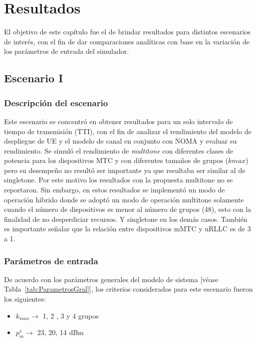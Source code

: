 
\chapter{Resultados} %

\label{Chapter7} %

El objetivo de este capítulo fue el de brindar resultados para distintos escenarios de interés, con el fin de dar comparaciones analíticas con base en la variación de los parámetros de entrada del simulador.


\section{Escenario I} %
\subsection{Descripción del escenario}
Este escenario se concentró en obtener resultados para un solo intervalo de tiempo de transmisión (TTI), con el fin de analizar el rendimiento del modelo de despliegue de UE y el modelo de canal en conjunto con NOMA y evaluar su rendimiento.
Se simuló el rendimiento de \textit{multitone} con diferentes clases de potencia para los dispositivos MTC y con diferentes tamaños de grupos ($kmax$) pero su desempeño no resultó ser importante ya que resultaba ser similar al de singletone. Por este motivo los resultados con la propuesta multitone no se reportaron. Sin embargo, en estos resultados se implementó un modo de operación hibrido donde se adoptó un modo de operación multitone solamente cuando el número de dispositivos es menor al número de grupos (48), esto con la finalidad de no desperdiciar recursos. Y singletone en los demás casos.
También es importante señalar que la relación entre dispositivos mMTC y uRLLC es de 3 a 1.
\subsection{Parámetros de entrada}
De acuerdo con los parámetros generales del modelo de sistema [véase Tabla~\ref{tab:ParametrosGral}], los criterios considerados para este escenario fueron los siguientes:
\begin{itemize} 
	\item $k_{max} \to $ 1, 2 , 3 y 4 grupos
	\item $p_{m}^{s} \to$ 23, 20, 14 dBm
\end{itemize}

